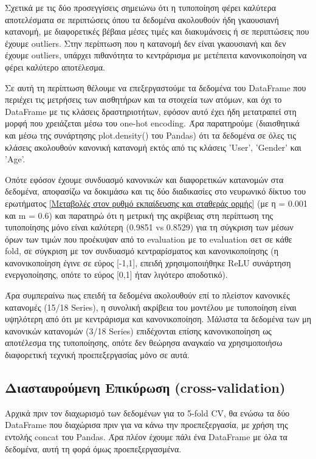 \documentclass[12pt,a4paper]{article}
\begin{document}
Σχετικά με τις δύο προσεγγίσεις σημειώνω ότι η τυποποίηση φέρει καλύτερα αποτελέσματα σε περιπτώσεις όπου τα δεδομένα ακολουθούν ήδη γκαουσιανή κατανομή, με διαφορετικές βέβαια μέσες τιμές και διακυμάνσεις ή σε περιπτώσεις που έχουμε outliers. Στην περίπτωση που η κατανομή δεν είναι γκαουσιανή και δεν έχουμε outliers, υπάρχει πιθανότητα το κεντράρισμα με μετέπειτα κανονικοποίηση να φέρει καλύτερο αποτέλεσμα.

Σε αυτή τη περίπτωση θέλουμε να επεξεργαστούμε τα δεδομένα του DataFrame που περιέχει τις μετρήσεις των αισθητήρων και τα στοιχεία των ατόμων, και όχι το DataFrame με τις κλάσεις δραστηριοτήτων, εφόσον αυτό έχει ήδη μετατραπεί στη μορφή που χρειάζεται μέσω του one-hot encoding. Άρα παρατηρούμε (διαισθητικά και μέσω της συνάρτησης plot.density() του Pandas) ότι τα δεδομένα σε όλες τις κλάσεις ακολουθούν κανονική κατανομή εκτός από τις κλάσεις 'User', 'Gender' και 'Age'.

Οπότε εφόσον έχουμε συνδυασμό κανονικών και διαφορετικών κατανομών στα δεδομένα, αποφασίζω να δοκιμάσω και τις δύο διαδικασίες στο νευρωνικό δίκτυο του ερωτήματος \ref{Μεταβολές στον ρυθμό εκπαίδευσης και σταθεράς ορμής} (με η = 0.001 και m = 0.6) και παρατηρώ ότι η μετρική της ακρίβειας στη περίπτωση της τυποποίησης μόνο είναι καλύτερη (0.9851 vs 0.8529) για τη σύγκριση των μέσων όρων των τιμών που προέκυψαν από το evaluation με το evaluation σετ σε κάθε fold, σε σύγκριση με τον συνδυασμό κεντραρίσματος και κανονικοποίησης (η κανονικοποίηση έγινε σε εύρος [-1,1], επειδή χρησιμοποιήθηκε ReLU συνάρτηση ενεργοποίησης, οπότε το εύρος [0,1] ήταν λιγότερο αποδοτικό).

Άρα συμπεραίνω πως επειδή τα δεδομένα ακολουθούν επί το πλείστον κανονικές κατανομές (15/18 Series), η συνολική ακρίβεια του μοντέλου με τυποποίηση είναι υψηλότερη από ότι με κεντράρισμα και κανονικοποίηση. Μάλιστα τα δεδομένα των μη κανονικών κατανομών (3/18 Series) επιδέχονται επίσης κανονικοποίηση ως αποτέλεσμα της τυποποίησης, οπότε δεν θεώρησα αναγκαίο να χρησιμοποιήσω διαφορετική τεχνική προεπεξεργασίας μόνο σε αυτά. 

\subsection{Διασταυρούμενη Επικύρωση (cross-validation)}

Αρχικά πριν τον διαχωρισμό των δεδομένων για το 5-fold CV, θα ενώσω τα δύο DataFrame που διαχώρισα πριν για να κάνω την προεπεξεργασία, με χρήση της εντολής concat του Pandas. Άρα πλέον έχουμε πάλι ένα DataFrame με όλα τα δεδομένα, αυτή τη φορά όμως προεπεξεργασμένα.
\end{document}
